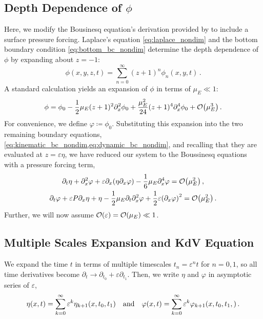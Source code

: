 \documentclass{jfm}
\renewcommand*{\epsilon}{\varepsilon}
\begin{document}
\subsection{Depth Dependence of \texorpdfstring{$\phi$}{Velocity Potential}}
Here, we modify the Bousinesq equation's derivation provided by
\citet{mei2005nonlinear} to include a surface pressure forcing.
Laplace's equation \cref{eq:laplace_nondim} and the bottom boundary
condition \cref{eq:bottom_bc_nondim} determine the depth dependence of
$\phi$ by expanding about $z=-1$:
\begin{equation}
  \phi(x,y,z,t) = \sum_{n=0}^\infty (z+1)^n\phi_n(x,y,t) \,.
\end{equation}
A standard calculation \citep[\eg][]{mei2005nonlinear} yields an
expansion of $\phi$ in terms of $\mu_E \ll 1$:
\begin{equation}
  \phi = \phi_0 - \frac{1}{2}\mu_E (z+1)^2\partial^2_x\phi_0 +
  \frac{\mu_E^2}{24}(z+1)^4\partial^4_x\phi_0 +
  \order{\mu_E^3} \,.
\end{equation}
For convenience, we define $\varphi \coloneqq \phi_0$.
Substituting this expansion into the two remaining boundary equations,
\cref{eq:kinematic_bc_nondim,eq:dynamic_bc_nondim}, and recalling that
they are evaluated at $z=\epsilon \eta$, we have reduced our system to
the Boussinesq equations with a pressure forcing term,
\begin{gather}
  \partial_t \eta + \partial_x^2 \varphi + \epsilon \partial_x
    \pqty{\eta \partial_x \varphi} -\frac{1}{6}\mu_E \partial^4_x
    \varphi = \order{\mu_E^2} \label{eq:kinematic_bc_varphi} \,, \\
  \partial_t \varphi + \epsilon P \partial_x \eta + \eta -
    \frac{1}{2}\mu_E \partial_t \partial_x^2 \varphi +
    \frac{1}{2}\epsilon\pqty{\partial_x \varphi}^2 = \order{\mu_E^2} \,.
    \label{eq:dynamic_bc_varphi}
\end{gather}
Further, we will now assume $\order{\epsilon} = \order{\mu_E} \ll 1$.

\subsection{\label{sec:shallow_water} Multiple Scales Expansion and KdV
Equation}
We expand the time $t$ in terms of multiple timescales $t_n =
\epsilon^n t$ for $n= 0,1$, so all time derivatives become $\partial_t \to
\partial_{t_0} + \epsilon \partial_{t_1}$.
Then, we write $\eta$ and $\varphi$ in asymptotic series of $\epsilon$,
\begin{equation}
  \eta(x,t) = \sum_{k=0}^{\infty} \epsilon^k
    \eta_{k+1}(x,t_0,t_1) \qq{and}
  \varphi(x,t) = \sum_{k=0}^{\infty} \epsilon^k
    \varphi_{k+1}(x,t_0,t_1,) \,.
\end{equation}
\end{document}
